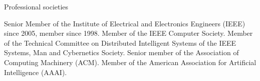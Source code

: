 \documentclass{resume}
\begin{document}

\begin{category}{Professional societies}

\citembullet Senior Member of the Institute of Electrical and Electronics
Engineers (IEEE) since 2005, member since 1998.
\citembullet Member of the IEEE Computer Society.
\citembullet Member of the Technical Committee on Distributed Intelligent
Systems of the IEEE Systems, Man and Cybernetics Society.
\citembullet Senior member of the Association of Computing Machinery (ACM).
\citembullet Member of the American Association for Artificial Intelligence
(AAAI).

\end{category}

\end{document}
